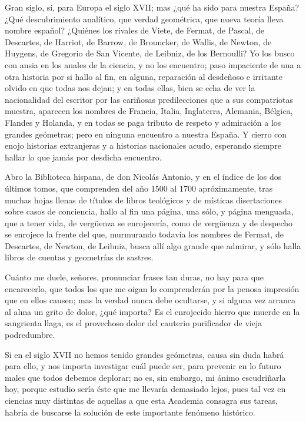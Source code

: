 \documentclass[a4paper, 12pt]{article}
\begin{document}
{{{{Gran siglo, sí, para Europa el siglo XVII; mas ¿qué ha sido para nuestra España? ¿Qué descubrimiento analítico, que verdad geométrica, que nueva teoría lleva nombre español? ¿Quiénes los rivales de Viete, de Fermat, de Pascal, de Descartes, de Harriot, de Barrow, de Brouncker, de Wallis, de Newton, de Huygens, de Gregorio de San Vicente, de Leibniz, de los Bernoulli?  Yo los busco con ansia en los anales de la ciencia, y no los encuentro; paso impaciente de una a otra historia por si hallo al fin, en alguna, reparación al desdeñoso e irritante olvido en que todas nos dejan; y en todas ellas, bien se echa de ver la nacionalidad del escritor por las cariñosas predilecciones que a sus compatriotas muestra, aparecen los nombres de Francia, Italia, Inglaterra, Alemania, Bélgica, Flandes y Holanda, y en todas se paga tributo de respeto y admiración a los grandes geómetras; pero en ninguna encuentro a nuestra España.  Y cierro con enojo historias extranjeras y a historias nacionales acudo, esperando siempre hallar lo que jamás por desdicha encuentro.

Abro la Biblioteca hispana, de don Nicolás Antonio, y en el índice de los dos últimos tomos, que comprenden del año 1500 al 1700 apróximamente, tras muchas hojas llenas de títulos de libros teológicos y de místicas disertaciones sobre casos de conciencia, hallo al fin una página, una sólo, y página menguada, que a tener vida, de vergüenza se enrojecería, como de vergüenza y de despecho se enrojece la frente del que, murmurando todavía los nombres de Fermat, de Descartes, de Newton, de Leibniz, busca allí algo grande que admirar, y sólo halla libros de cuentas y geometrías de sastres.

Cuánto me duele, señores, pronunciar frases tan duras, no hay para que encarecerlo, que todos los que me oigan lo comprenderán por la penosa impresión que en ellos causen; mas la verdad nunca debe ocultarse, y si alguna vez arranca al alma un grito de dolor, ¿qué importa?  Es el enrojecido hierro que muerde en la sangrienta llaga, es el provechoso dolor del cauterio purificador de vieja podredumbre.

Si en el siglo XVII no hemos tenido grandes geómetras, causa sin duda habrá para ello, y nos importa investigar cuál puede ser, para prevenir en lo futuro males que todos debemos deplorar; no es, sin embargo, mi ánimo escudriñarla hoy, porque estudio sería éste que me llevaría demasiado lejos, pues tal vez en ciencias muy distintas de aquellas a que esta Academia consagra sus tareas, habría de buscarse la solución de este importante fenómeno histórico.

}}}}
\end{document}
